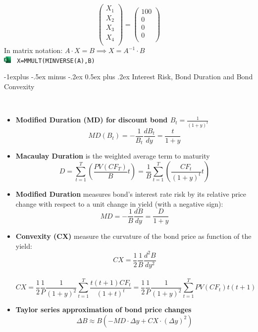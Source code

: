 \documentclass[10pt,landscape,a4paper]{article}
\makeatletter
\renewcommand{\subsection}{\@startsection{subsection}{2}{0mm}%
                                {-1explus -.5ex minus -.2ex}%
                                {0.5ex plus .2ex}%
                                {\normalfont\normalsize\bfseries}}
\makeatother
\begin{document}
\begin{multicols*}{3}
\begin{description}[itemsep=0pt]
\begin{itemize}
$$\begin{pmatrix}
			X_1\\
			X_2 \\
			X_3 \\
			X_4 \\									
		\end{pmatrix}	
		=
		\begin{pmatrix}
		100\\
		0 \\
		0 \\
     	0 \\									
		\end{pmatrix}
		$$ In matrix notation:  
		$A \cdot X = B  \implies X = A^{-1}\cdot B$ \\
	{\includegraphics[width=0.15in]{images/excel_logo.png}} \texttt{ X=MMULT(MINVERSE(A),B)}
	\end{itemize}
\end{description}


\subsection{Interest Risk, Bond Duration and Bond Convexity}
\begin{description}[itemsep=0pt]
	\item[Bond Duration]  ~
	\begin{itemize}
		\item {\bf Modified Duration (MD) for discount bond $ B_t=\frac{1}{(1+y)^t} $ } $$ MD(B_t) = -\frac{1}{B_t}\frac{dB_t}{dy} = \frac{t}{1+y}$$
		\item {\bf Macaulay Duration} is the weighted average term to maturity  $$ D = \sum_{t=1}^{T} \left(   \frac{PV(CF_T)}{B}  t \right)  =   \frac{1}{B}\sum_{t=1}^{T} \left(  \frac{CF_t}{(1+y)^t} t \right)  $$
		\item {\bf Modified Duration} measures bond's interest rate risk by its relative price change with respect
		to a unit change in yield (with a negative sign):  $$ MD =  -\frac{1}{B}\frac{dB}{dy}  = \frac{D}{1+y}  $$
		\item {\bf Convexity (CX)} measure the curvature of the bond price as function of the yield:  $$ CX =  \frac{1}{2}\frac{1}{B}\frac{d^2B}{dy^2}  $$ \\
		   $$ CX = \frac{1}{2} \frac{1}{P} \frac{1}{(1+y)^2} \sum_{t=1}^{T} \frac{t (t+1) CF_t}{(1+t)^t} =  \frac{1}{2} \frac{1}{P} \frac{1}{(1+y)^2} \sum_{t=1}^{T} PV(CF_t) t (t+1)  $$
		\item {\bf Taylor series approximation of bond price changes}  $$ \Delta B \approx  B \left(  -MD  \cdot \Delta y + CX \cdot ( \Delta y)^2 \right)    $$
	\end{itemize}
\end{description}



\end{multicols*}
\end{document}
